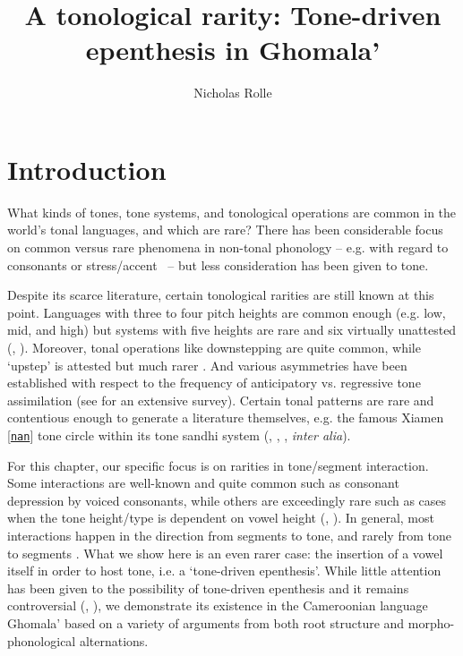 \documentclass[output=paper,colorlinks,citecolor=brown,draft,draftmode]{langscibook}
\author{Nicholas Rolle\affiliation{Princeton University; The Leibniz-Centre General Linguistics (ZAS), Berlin}\orcid{0000-0002-1263-5930}}
\title{A tonological rarity: Tone-driven epenthesis in Ghomala'}
\begin{document}
\maketitle

\section{Introduction}\label{sec:intro}
What kinds of tones, tone systems, and tonological operations are common in the world's tonal languages, and which are rare?
There has been considerable focus on common versus rare phenomena in non-tonal phonology -- e.g. with regard to consonants \citep{butskhrikidze2010,tuttle2010} or stress/accent \citep{helmbrecht2010}~-- 
but less consideration has been given to tone.

Despite its scarce literature, certain tonological rarities are still known at this point. 
Languages with three to four pitch heights are common enough (e.g. low, mid, and high) but systems with five heights are rare and six virtually unattested (\citealt[20]{yip2002}, \citealt{odden2020}).
Moreover, tonal operations like downstepping are quite common, while `upstep' is attested but much rarer \citep{snider1990}.
And various asymmetries have been established with respect to the frequency of anticipatory vs. regressive tone assimilation (see \citealt{hyman2007} for an extensive survey).
Certain tonal patterns are rare and contentious enough to generate a literature  themselves, e.g. the famous Xiamen [\href{https://glottolog.org/resource/languoid/id/minn1241}{\texttt{nan}}] tone circle within its tone sandhi system (\citealt{dong1960}, \citealt[42ff]{chen2000}, \citealt{zhang2006wug}, \textit{inter alia}).

For  this chapter, our specific focus is on rarities in tone/segment interaction.
Some interactions are  well-known and quite common such as consonant depression by voiced consonants,
while others are exceedingly rare such as cases when the tone height/type is dependent on vowel height
(\citealt{jiang1999}, 
\citealt[31]{yip2002}).
In general, most interactions happen in the direction from segments to tone, and rarely from tone to segments \citep[208]{wee2019}.
What we show here is an even rarer case: the insertion of a vowel itself in order to host tone, i.e. a `tone-driven epenthesis'.
While little attention has been given to the possibility of tone-driven epenthesis and it remains controversial (\citealt{gleim2019}, \citealt{rollemerrill2022}), we demonstrate its existence in the Cameroonian language Ghomala' based on a variety of arguments from both root structure and morpho-phonological alternations.
\end{document}
